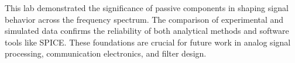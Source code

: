 \documentclass[12pt]{article}
\begin{document}
This lab demonstrated the significance of passive components in shaping signal
behavior across the frequency spectrum. The comparison of experimental and
simulated data confirms the reliability of both analytical methods and software
tools like SPICE. These foundations are crucial for future work in analog signal processing, communication electronics, and filter design.
\end{document}

